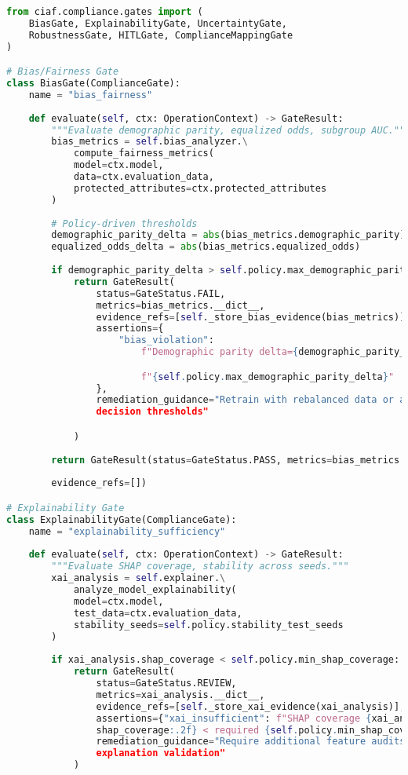 \documentclass[12pt,a4paper]{article}
\begin{document}
\begin{lstlisting}[language=Python, caption=Specialized Compliance Gates]
from ciaf.compliance.gates import (
    BiasGate, ExplainabilityGate, UncertaintyGate, 
    RobustnessGate, HITLGate, ComplianceMappingGate
)

# Bias/Fairness Gate
class BiasGate(ComplianceGate):
    name = "bias_fairness"
    
    def evaluate(self, ctx: OperationContext) -> GateResult:
        """Evaluate demographic parity, equalized odds, subgroup AUC."""
        bias_metrics = self.bias_analyzer.\
            compute_fairness_metrics(
            model=ctx.model,
            data=ctx.evaluation_data,
            protected_attributes=ctx.protected_attributes
        )
        
        # Policy-driven thresholds
        demographic_parity_delta = abs(bias_metrics.demographic_parity)
        equalized_odds_delta = abs(bias_metrics.equalized_odds)
        
        if demographic_parity_delta > self.policy.max_demographic_parity_delta:
            return GateResult(
                status=GateStatus.FAIL,
                metrics=bias_metrics.__dict__,
                evidence_refs=[self._store_bias_evidence(bias_metrics)],
                assertions={
                    "bias_violation": 
                        f"Demographic parity delta={demographic_parity_delta:.3f} > "

                        f"{self.policy.max_demographic_parity_delta}"
                },
                remediation_guidance="Retrain with rebalanced data or adjust
                decision thresholds"

            )
        
        return GateResult(status=GateStatus.PASS, metrics=bias_metrics.__dict__, 
        
        evidence_refs=[])

# Explainability Gate  
class ExplainabilityGate(ComplianceGate):
    name = "explainability_sufficiency"
    
    def evaluate(self, ctx: OperationContext) -> GateResult:
        """Evaluate SHAP coverage, stability across seeds."""
        xai_analysis = self.explainer.\
            analyze_model_explainability(
            model=ctx.model,
            test_data=ctx.evaluation_data,
            stability_seeds=self.policy.stability_test_seeds
        )
        
        if xai_analysis.shap_coverage < self.policy.min_shap_coverage:
            return GateResult(
                status=GateStatus.REVIEW,
                metrics=xai_analysis.__dict__,
                evidence_refs=[self._store_xai_evidence(xai_analysis)],
                assertions={"xai_insufficient": f"SHAP coverage {xai_analysis.
                shap_coverage:.2f} < required {self.policy.min_shap_coverage}"},
                remediation_guidance="Require additional feature audits and 
                explanation validation"
            )
        

\end{lstlisting}
\end{document}

